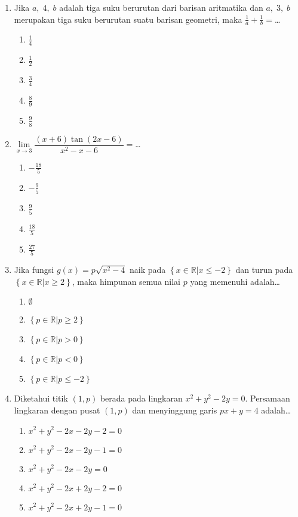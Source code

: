 \documentclass[A4,12PT, english, twocolumn]{journal}
\begin{document}
\begin{enumerate}
\item Jika $a, \; 4, \; b$ adalah tiga suku berurutan dari barisan aritmatika dan $a, \; 3, \; b$ merupakan tiga suku berurutan suatu barisan geometri, maka $\frac{1}{a} + \frac{1}{b} =$\dots
    \begin{enumerate}
        \item $\frac{1}{4}$
        \item $\frac{1}{2}$
        \item $\frac{3}{4}$
        \item $\frac{8}{9}$
        \item $\frac{9}{8}$
    \end{enumerate}

\item $\lim\limits_{x \longrightarrow 3} \dfrac{\left(x+6 \right) \tan{\left(2x-6 \right)}}{x^2-x-6}=$\dots
    \begin{enumerate}
        \item $-\frac{18}{5}$
        \item $-\frac{9}{5}$
        \item $\frac{9}{5}$
        \item $\frac{18}{5}$
        \item $\frac{27}{5}$
    \end{enumerate}

\item Jika fungsi $g(x) = p \sqrt{x^2-4}$ naik pada $\left\{x \in \mathbb{R} | x \leq -2 \right \}$ dan turun pada $\left \{x \in \mathbb{R} | x \geq 2 \right \}$, maka himpunan semua nilai $p$ yang memenuhi adalah\dots
    \begin{enumerate}
        \item $\emptyset$
        \item $\left\{ p \in \mathbb{R} | p \geq 2 \right\}$
        \item $\left\{ p \in \mathbb{R} | p > 0 \right\}$
        \item $\left\{ p \in \mathbb{R} | p < 0 \right\}$
        \item $\left\{ p \in \mathbb{R}| p \leq -2 \right\}$
    \end{enumerate}
    
\item Diketahui titik $(1,p)$ berada pada lingkaran $x^2 + y^2 -2y = 0$. Persamaan lingkaran dengan pusat $(1,p)$ dan menyinggung garis $px + y = 4$ adalah\dots
    \begin{enumerate}
        \item $x^2 + y^2 -2x -2y - 2 = 0$
        \item $x^2 + y^2 -2x -2y - 1 = 0$
        \item $x^2 + y^2 -2x -2y = 0$
        \item $x^2 + y^2 -2x +2y - 2 = 0$
        \item $x^2 + y^2 -2x +2y - 1 = 0$
    \end{enumerate}


\end{enumerate}
\end{document}
